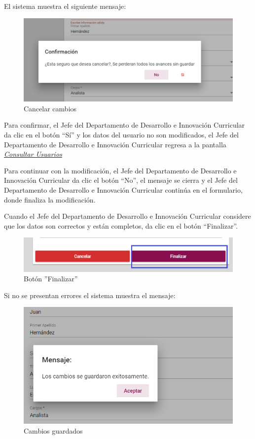 El sistema muestra el siguiente mensaje:
\clearpage
\begin{figure}[H]
	\centering
	\includegraphics[width=0.4\linewidth]{images/SP5/MSG29}
	\caption{Cancelar cambios}
	\label{mensaje29-JDDIC}
	
\end{figure}

Para confirmar, el Jefe del Departamento de Desarrollo e Innovación Curricular da clic en el botón “Sí” y los datos del usuario no son modificados, el Jefe del Departamento de Desarrollo e Innovación Curricular regresa a la pantalla \hyperlink{consultarUs-JDDIC}{\textit{Consultar Usuarios}}

Para continuar con la modificación, el Jefe del Departamento de Desarrollo e Innovación Curricular  da clic el botón “No”, el mensaje se cierra y el Jefe del Departamento de Desarrollo e Innovación Curricular continúa en el formulario, donde finaliza la modificación.

Cuando el Jefe del Departamento de Desarrollo e Innovación Curricular considere que los datos son correctos y están completos, da clic en el botón “Finalizar”.
\begin{figure}[H]
	\centering
	\hypertarget{btnfin-JDDIC}{\includegraphics[width=0.7\linewidth]{images/SP5/BtnFinalizar}}
	\caption{Botón ''Finalizar''}
	\label{btnfin-JDDIC}
\end{figure}

Si no se presentan errores el sistema muestra el mensaje:

\begin{figure}[H]
	\centering
	\includegraphics[width=0.4\linewidth]{images/SP5/MSG31}
	\caption{Cambios guardados}
	\label{mensaje31-JDDIC}
	
\end{figure}


